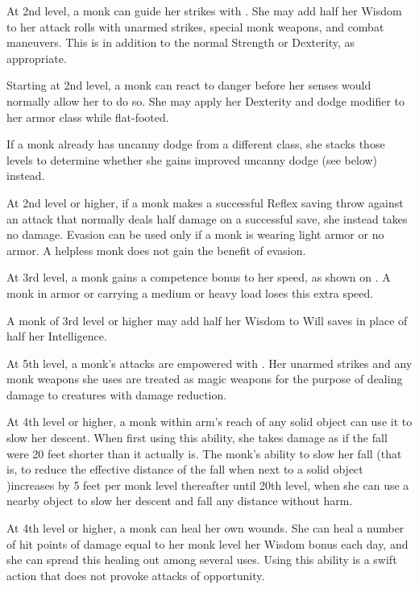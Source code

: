  At 2nd level, a monk can guide her strikes with \ki. She may add half her Wisdom to her attack rolls with unarmed strikes, special monk weapons, and combat maneuvers. This is in addition to the normal Strength or Dexterity, as appropriate.

 Starting at 2nd level, a monk can react to danger before her senses would normally allow her to do so. She may apply her Dexterity and dodge modifier to her armor class while flat-footed.

If a monk already has uncanny dodge from a different class, she stacks those levels to determine whether she gains improved uncanny dodge (see below) instead.

 At 2nd level or higher, if a monk makes a successful Reflex saving throw against an attack that normally deals half damage on a successful save, she instead takes no damage. Evasion can be used only if a monk is wearing light armor or no armor. A helpless monk does not gain the benefit of evasion.

 At 3rd level, a monk gains a competence bonus to her speed, as shown on . A monk in armor or carrying a medium or heavy load loses this extra speed.

 A monk of 3rd level or higher may add half her Wisdom to Will saves in place of half her Intelligence.

 At 5th level, a monk's attacks are empowered with \ki. Her unarmed strikes and any monk weapons she uses are treated as magic weapons for the purpose of dealing damage to creatures with damage reduction.

  At 4th level or higher, a monk within arm's reach of any solid object can use it to slow her descent. When first using this ability, she takes damage as if the fall were 20 feet shorter than it actually is. The monk's ability to slow her fall (that is, to reduce the effective distance of the fall when next to a solid object )increases by 5 feet per monk level thereafter until 20th level, when she can use a nearby object to slow her descent and fall any distance without harm.

  At 4th level or higher, a monk can heal her own wounds. She can heal a number of hit points of damage equal to her monk level \mtimes her Wisdom bonus each day, and she can spread this healing out among several uses.  Using this ability is a swift action that does not provoke attacks of opportunity.

